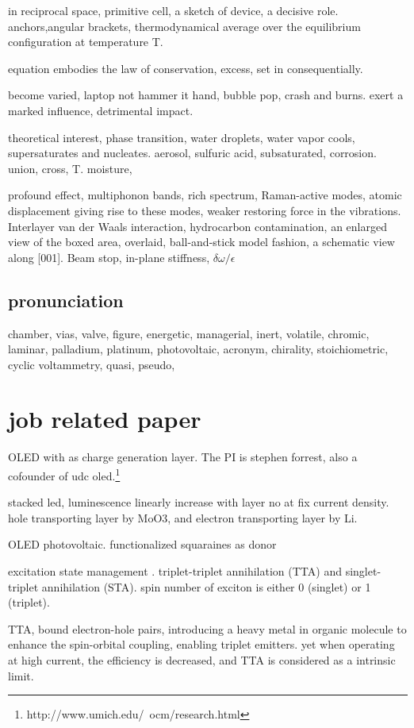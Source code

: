 in reciprocal space, primitive cell, a sketch of device, a decisive role. anchors,angular brackets, thermodynamical average over the equilibrium configuration at temperature T.

equation embodies the law of conservation, excess, set in consequentially.

become varied, laptop not hammer it hand, bubble pop, crash and burns. exert a marked influence, detrimental impact.

theoretical interest, phase transition, water droplets, water vapor cools, supersaturates and nucleates. aerosol, sulfuric acid, subsaturated, corrosion. union, cross, T. moisture,

profound effect, multiphonon bands, rich spectrum, Raman-active modes, atomic displacement giving rise to these modes, weaker restoring force in the vibrations. Interlayer van der Waals interaction, hydrocarbon contamination, an enlarged view of the boxed area, overlaid, ball-and-stick model fashion, a schematic view along [001]. Beam stop, in-plane stiffness, $\delta\omega/\epsilon$ 

\subsection{pronunciation}

chamber, vias, valve, figure, energetic, managerial, inert, volatile, chromic,
laminar, palladium, platinum, photovoltaic, acronym, chirality, stoichiometric, cyclic voltammetry, quasi, pseudo, 

\section{job related paper}

OLED with  as charge generation layer. \cite{Kanno2006} The PI is stephen forrest, also a cofounder of udc oled.\footnote{http://www.umich.edu/~ocm/research.html}

stacked led, luminescence linearly increase with layer no at fix current density. hole transporting layer by MoO3, and electron transporting layer by Li.

OLED photovoltaic.\cite{Xiao2012a} functionalized squaraines as donor

excitation state management \cite{Zhang2012b}.
triplet-triplet annihilation (TTA) and singlet-triplet annihilation (STA). spin number of exciton is either 0 (singlet) or 1 (triplet).

TTA, bound electron-hole pairs, introducing a heavy metal in organic molecule to enhance the spin-orbital coupling, enabling triplet emitters.\cite{Zhang2013i} yet when operating at high current, the efficiency is decreased, and TTA is considered as a intrinsic limit.


